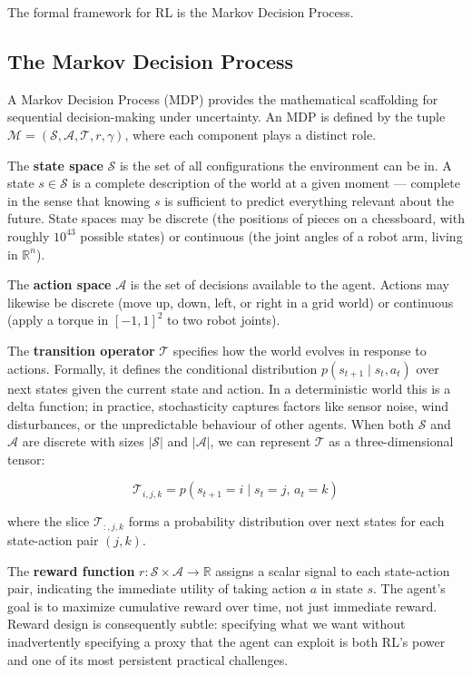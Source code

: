 \documentclass{book}
\begin{document}
The formal framework for RL is the Markov Decision Process.

\subsection{The Markov Decision Process}
\label{sec:mdp}

A Markov Decision Process (MDP) provides the mathematical scaffolding for
sequential decision-making under uncertainty. An MDP is defined by the
tuple $\mathcal{M} = (\mathcal{S}, \mathcal{A}, \mathcal{T}, r, \gamma)$,
where each component plays a distinct role.

The \textbf{state space} $\mathcal{S}$ is the set of all configurations
the environment can be in. A state $s \in \mathcal{S}$ is a complete
description of the world at a given moment --- complete in the sense that
knowing $s$ is sufficient to predict everything relevant about the future.
State spaces may be discrete (the positions of pieces on a chessboard,
with roughly $10^{43}$ possible states) or continuous (the joint angles
of a robot arm, living in $\mathbb{R}^n$).

The \textbf{action space} $\mathcal{A}$ is the set of decisions available
to the agent. Actions may likewise be discrete (move up, down, left, or
right in a grid world) or continuous (apply a torque in $[-1, 1]^2$ to
two robot joints).

The \textbf{transition operator} $\mathcal{T}$ specifies how the world
evolves in response to actions. Formally, it defines the conditional
distribution $p(s_{t+1} \mid s_t, a_t)$ over next states given the current
state and action. In a deterministic world this is a delta function; in
practice, stochasticity captures factors like sensor noise, wind
disturbances, or the unpredictable behaviour of other agents. When both
$\mathcal{S}$ and $\mathcal{A}$ are discrete with sizes $|\mathcal{S}|$
and $|\mathcal{A}|$, we can represent $\mathcal{T}$ as a three-dimensional
tensor:

\begin{equation}
\label{eq:transition_tensor}
\mathcal{T}_{i,j,k} = p(s_{t+1} = i \mid s_t = j,\, a_t = k)
\end{equation}

where the slice $\mathcal{T}_{:,j,k}$ forms a probability distribution
over next states for each state-action pair $(j, k)$.

The \textbf{reward function} $r : \mathcal{S} \times \mathcal{A}
\rightarrow \mathbb{R}$ assigns a scalar signal to each state-action pair,
indicating the immediate utility of taking action $a$ in state $s$. The
agent's goal is to maximize cumulative reward over time, not just immediate
reward. Reward design is consequently subtle: specifying what we want
without inadvertently specifying a proxy that the agent can exploit is
both RL's power and one of its most persistent practical challenges.
\end{document}
